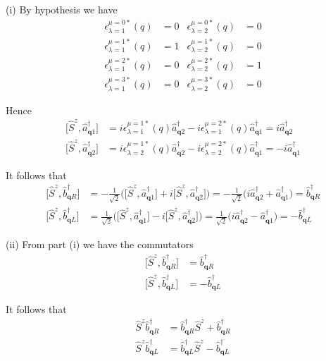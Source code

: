 \bigskip
(i) By hypothesis we have
\begin{align*}
\epsilon_{\lambda=1}^{\mu=0*}(q)&=0 & \epsilon_{\lambda=2}^{\mu=0*}(q)&=0
\\
\epsilon_{\lambda=1}^{\mu=1*}(q)&=1 & \epsilon_{\lambda=2}^{\mu=1*}(q)&=0
\\
\epsilon_{\lambda=1}^{\mu=2*}(q)&=0 & \epsilon_{\lambda=2}^{\mu=2*}(q)&=1
\\
\epsilon_{\lambda=1}^{\mu=3*}(q)&=0 & \epsilon_{\lambda=2}^{\mu=3*}(q)&=0
\end{align*}

Hence
\begin{align*}
\big[\hat S^z,\hat a_{\mathbf q1}^\dag\big]
&=i\epsilon_{\lambda=1}^{\mu=1*}(q)\hat a_{\mathbf q2}^\dag
-i\epsilon_{\lambda=1}^{\mu=2*}(q)\hat a_{\mathbf q1}^\dag
=i\hat a_{\mathbf q2}^\dag
\\
\big[\hat S^z,\hat a_{\mathbf q2}^\dag\big]
&=i\epsilon_{\lambda=2}^{\mu=1*}(q)\hat a_{\mathbf q2}^\dag
-i\epsilon_{\lambda=2}^{\mu=2*}(q)\hat a_{\mathbf q1}^\dag
=-i\hat a_{\mathbf q1}^\dag
\end{align*}

It follows that
\begin{align*}
\big[\hat S^z,\hat b_{\mathbf qR}^\dag\big]
&=-\frac{1}{\sqrt2}
\Big(
\big[\hat S^z,\hat a_{\mathbf q1}^\dag\big]+
i\big[\hat S^z,\hat a_{\mathbf q2}^\dag\big]
\Big)
=-\frac{1}{\sqrt2}\big(i\hat a_{\mathbf q2}^\dag+\hat a_{\mathbf q1}^\dag\big)
=\hat b_{\mathbf qR}^\dag
\\
\big[\hat S^z,\hat b_{\mathbf qL}^\dag\big]
&=\frac{1}{\sqrt2}
\Big(
\big[\hat S^z,\hat a_{\mathbf q1}^\dag\big]-
i\big[\hat S^z,\hat a_{\mathbf q2}^\dag\big]
\Big)
=\frac{1}{\sqrt2}\big(i\hat a_{\mathbf q2}^\dag-\hat a_{\mathbf q1}^\dag\big)
=-\hat b_{\mathbf qL}^\dag
\end{align*}

(ii) From part (i) we have the commutators
\begin{align*}
\big[\hat S^z,\hat b_{\mathbf qR}^\dag\big]&=\hat b_{\mathbf qR}^\dag
\\
\big[\hat S^z,\hat b_{\mathbf qL}^\dag\big]&=-\hat b_{\mathbf qL}^\dag
\end{align*}

It follows that
\begin{align*}
\hat S^z\hat b_{\mathbf qR}^\dag&=\hat b_{\mathbf qR}^\dag\hat S^z+\hat b_{\mathbf qR}^\dag
\\
\hat S^z\hat b_{\mathbf qL}^\dag&=\hat b_{\mathbf qL}^\dag\hat S^z-\hat b_{\mathbf qL}^\dag
\end{align*}

